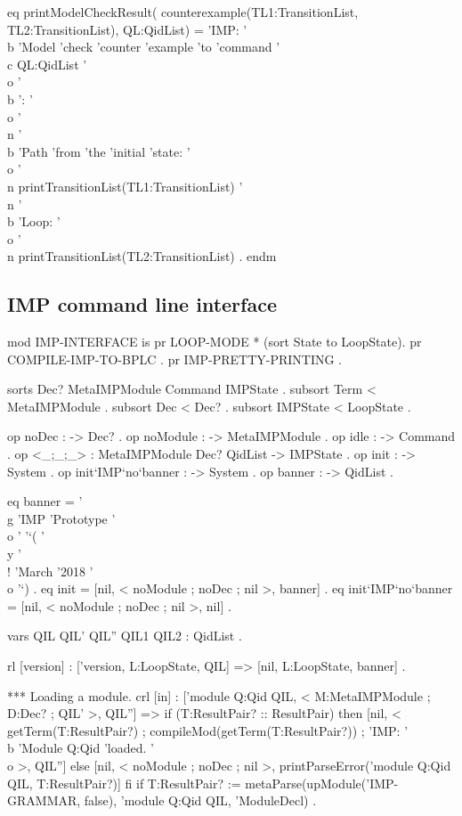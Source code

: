 \documentclass[a4paper,openany]{book}
\begin{document}
 eq printModelCheckResult(
    counterexample(TL1:TransitionList, TL2:TransitionList), QL:QidList) =
    'IMP: '\\b 'Model 'check 'counter 'example 'to 'command 
    '\\c QL:QidList '\\o '\\b ': '\\o '\\n
    '\\b 'Path 'from 'the 'initial 'state: '\\o
    '\\n printTransitionList(TL1:TransitionList)
    '\\n '\\b 'Loop: '\\o
    '\\n printTransitionList(TL2:TransitionList) .
endm
\nwendcode{}\nwdocspar

\subsection{IMP command line interface}

\nwenddocs{}\endmoddef\nwstartdeflinemarkup\nwenddeflinemarkup
mod IMP-INTERFACE is
 pr LOOP-MODE * (sort State to LoopState).
 pr COMPILE-IMP-TO-BPLC .
 pr IMP-PRETTY-PRINTING .

 sorts Dec? MetaIMPModule Command IMPState .
 subsort Term < MetaIMPModule .
 subsort Dec < Dec? .
 subsort IMPState < LoopState .

 op noDec : -> Dec? .
 op noModule : -> MetaIMPModule .
 op idle : -> Command .
 op <_;_;_> : MetaIMPModule Dec? QidList -> IMPState .
 op init : -> System .
 op init`IMP`no`banner : -> System .
 op banner : -> QidList .
 
 eq banner = '\\g 'IMP 'Prototype '\\o ' 
             '`( '\\y '\\! 'March '2018 '\\o '`) .
 eq init = [nil, < noModule ; noDec ; nil >, banner] .
 eq init`IMP`no`banner = [nil, < noModule ; noDec ; nil >, nil] .

 vars QIL QIL' QIL'' QIL1 QIL2 : QidList .

 rl [version] : ['version, L:LoopState, QIL] => 
                [nil, L:LoopState, banner] .

 *** Loading a module.
 crl [in] : ['module Q:Qid QIL, 
             < M:MetaIMPModule ; D:Dec? ; QIL' >, QIL''] =>
  if (T:ResultPair? :: ResultPair)
  then [nil, < getTerm(T:ResultPair?) ;
               compileMod(getTerm(T:ResultPair?)) ;
               'IMP: '\\b 'Module Q:Qid 'loaded. '\\o  >, QIL'']
  else [nil, < noModule ; noDec ; nil >,
        printParseError('module Q:Qid QIL, T:ResultPair?)]
  fi
 if T:ResultPair? :=
    metaParse(upModule('IMP-GRAMMAR, false), 
     'module Q:Qid QIL, 'ModuleDecl) .
\end{document}
